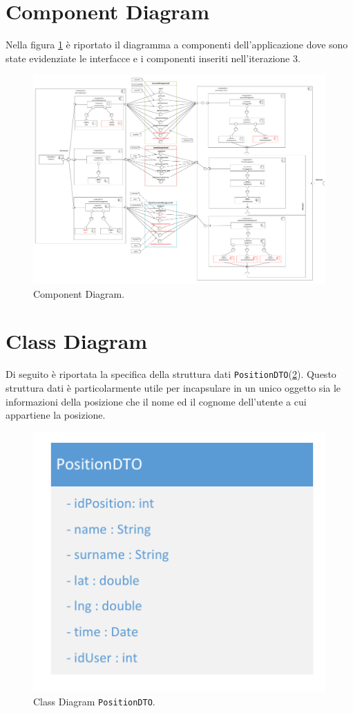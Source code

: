 \section{Component Diagram}
Nella figura \ref{fig:ComponentDiagram_iterazione3} è riportato il diagramma a componenti dell'applicazione dove sono state evidenziate le interfacce e i componenti inseriti nell'iterazione 3. 
\begin{figure}[h!]
	\centering
	\includegraphics[width=1\linewidth]{./Iterazione 3/OtherFiles/UML - Component view}
	\caption{Component Diagram.}
	\label{fig:ComponentDiagram_iterazione3}
\end{figure}

\clearpage

\section{Class Diagram}
Di seguito è riportata la specifica della struttura dati \texttt{PositionDTO}(\Fig\ref{fig:ClassDiagramDTO_iterazione3}). Questo struttura dati è particolarmente utile per incapsulare in un unico oggetto sia le informazioni della posizione che il nome ed il cognome dell'utente a cui appartiene la posizione.

\begin{figure}[h!]
	\centering
	\includegraphics[width=0.7\linewidth]{./Iterazione 3/OtherFiles/DTOSpecification}
	\caption{Class Diagram \texttt{PositionDTO}.}
	\label{fig:ClassDiagramDTO_iterazione3}
\end{figure}

